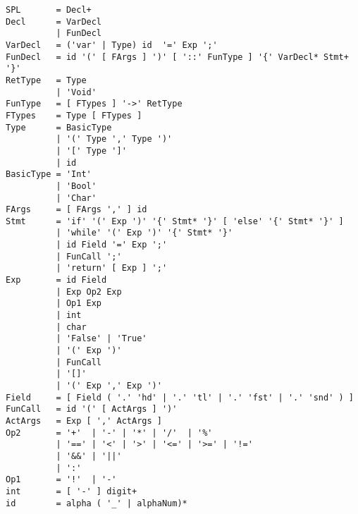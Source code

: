 \documentclass[dvipsnames]{report}
\begin{document}
\begin{verbatim}
SPL       = Decl+
Decl      = VarDecl
          | FunDecl
VarDecl   = ('var' | Type) id  '=' Exp ';'
FunDecl   = id '(' [ FArgs ] ')' [ '::' FunType ] '{' VarDecl* Stmt+ '}'
RetType   = Type
          | 'Void'
FunType   = [ FTypes ] '->' RetType
FTypes    = Type [ FTypes ]
Type      = BasicType
          | '(' Type ',' Type ')'
          | '[' Type ']'
          | id
BasicType = 'Int'
          | 'Bool'
          | 'Char'
FArgs     = [ FArgs ',' ] id
Stmt      = 'if' '(' Exp ')' '{' Stmt* '}' [ 'else' '{' Stmt* '}' ]
          | 'while' '(' Exp ')' '{' Stmt* '}'
          | id Field '=' Exp ';'
          | FunCall ';'
          | 'return' [ Exp ] ';'
Exp       = id Field
          | Exp Op2 Exp
          | Op1 Exp
          | int
          | char
          | 'False' | 'True'
          | '(' Exp ')'
          | FunCall
          | '[]'
          | '(' Exp ',' Exp ')'
Field     = [ Field ( '.' 'hd' | '.' 'tl' | '.' 'fst' | '.' 'snd' ) ]
FunCall   = id '(' [ ActArgs ] ')'
ActArgs   = Exp [ ',' ActArgs ]
Op2       = '+'  | '-' | '*' | '/'  | '%'
          | '==' | '<' | '>' | '<=' | '>=' | '!='
          | '&&' | '||'
          | ':'
Op1       = '!'  | '-'
int       = [ '-' ] digit+
id        = alpha ( '_' | alphaNum)*
\end{verbatim}
\end{document}
